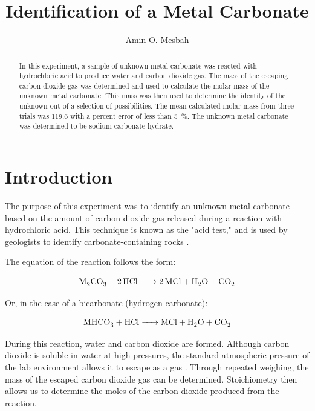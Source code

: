 \documentclass[
journal=aamick,
manuscript=article]{achemso}
\author{Amin O. Mesbah}
\affiliation[LACC]{Department of Chemistry, Los Angeles City College, Los Angeles, CA}
\title[Experiment 03]
{Identification of a Metal Carbonate}
\begin{document}

\begin{abstract}
In this experiment, a sample of unknown metal carbonate was reacted with hydrochloric acid to produce water and carbon dioxide gas. The mass of the escaping carbon dioxide gas was determined and used to calculate the molar mass of the unknown metal carbonate. This mass was then used to determine the identity of the unknown out of a selection of possibilities. The mean calculated molar mass from three trials was \SI{119.6}{\Molar} with a percent error of less than \SI{5}{\percent}. The unknown metal carbonate was determined to be sodium carbonate hydrate.
\end{abstract}




\section{Introduction}
The purpose of this experiment was to identify an unknown metal carbonate based on the amount of carbon dioxide gas released during a reaction with hydrochloric acid. This technique is known as the "acid test," and is used by geologists to identify carbonate-containing rocks \cite{m}.

The equation of the reaction follows the form:

\begin{equation}
    \ce{M2CO3 + 2HCl -> 2MCl + H2O + CO2}
    \label{eq:carbonate}
\end{equation}

Or, in the case of a bicarbonate (hydrogen carbonate):

\begin{equation}
    \ce{MHCO3 + HCl -> MCl + H2O + CO2}
    \label{eq:bicarbonate}
\end{equation}

During this reaction, water and carbon dioxide are formed. Although carbon dioxide is soluble in water at high pressures, the standard atmospheric pressure of the lab environment allows it to escape as a gas \cite{d}. Through repeated weighing, the mass of the escaped carbon dioxide gas can be determined. Stoichiometry then allows us to determine the moles of the carbon dioxide produced from the reaction.
\end{document}
